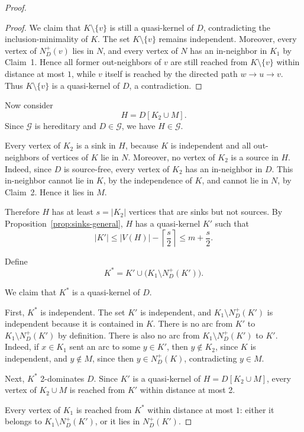 \documentclass[11pt,a4paper]{article}
\begin{document}
\begin{proof}
\begin{proof}
We claim that \(K\setminus\{v\}\) is still a quasi-kernel of \(D\),
contradicting the inclusion-minimality of \(K\).
The set \(K\setminus\{v\}\) remains independent.
Moreover, every vertex of \(N_D^+(v)\) lies in \(N\), and every vertex of \(N\)
has an in-neighbor in \(K_1\) by Claim~1. Hence all former out-neighbors of
\(v\) are still reached from \(K\setminus\{v\}\) within distance at most \(1\),
while \(v\) itself is reached by the directed path \(w\to u\to v\).
Thus \(K\setminus\{v\}\) is a quasi-kernel of \(D\), a contradiction.
\end{proof}

Now consider
\[
    H=D[K_2\cup M].
\]
Since \(\mathcal G\) is hereditary and \(D\in\mathcal G\),
we have \(H\in\mathcal G\).

Every vertex of \(K_2\) is a sink in \(H\), because \(K\) is independent and
all out-neighbors of vertices of \(K\) lie in \(N\).
Moreover, no vertex of \(K_2\) is a source in \(H\).
Indeed, since \(D\) is source-free, every vertex of \(K_2\) has an
in-neighbor in \(D\). This in-neighbor cannot lie in \(K\), by the
independence of \(K\), and cannot lie in \(N\), by Claim~2.
Hence it lies in \(M\).

Therefore \(H\) has at least \(s=|K_2|\) vertices that are sinks but not
sources. By Proposition~\ref{prop:sinks-general}, \(H\) has a quasi-kernel
\(K'\) such that
\[
    |K'|
    \le
    |V(H)|-\left\lceil\frac s2\right\rceil
    \le
    m+\frac s2.
\]

Define
\[
    K^*
    =
    K'
    \cup
    \bigl(K_1\setminus N_D^+(K')\bigr).
\]

We claim that \(K^*\) is a quasi-kernel of \(D\).

First, \(K^*\) is independent.
The set \(K'\) is independent, and
\(K_1\setminus N_D^+(K')\) is independent because it is contained in \(K\).
There is no arc from \(K'\) to
\(K_1\setminus N_D^+(K')\) by definition.
There is also no arc from \(K_1\setminus N_D^+(K')\) to \(K'\).
Indeed, if \(x\in K_1\) sent an arc to some \(y\in K'\), then
\(y\notin K_2\), since \(K\) is independent, and
\(y\notin M\), since then \(y\in N_D^+(K)\), contradicting \(y\in M\).

Next, \(K^*\) 2-dominates \(D\).
Since \(K'\) is a quasi-kernel of \(H=D[K_2\cup M]\),
every vertex of \(K_2\cup M\) is reached from \(K'\) within distance at most 2.

Every vertex of \(K_1\) is reached from \(K^*\) within distance at most \(1\):
either it belongs to \(K_1\setminus N_D^+(K')\), or it lies in \(N_D^+(K')\).


\end{proof}
\end{document}

